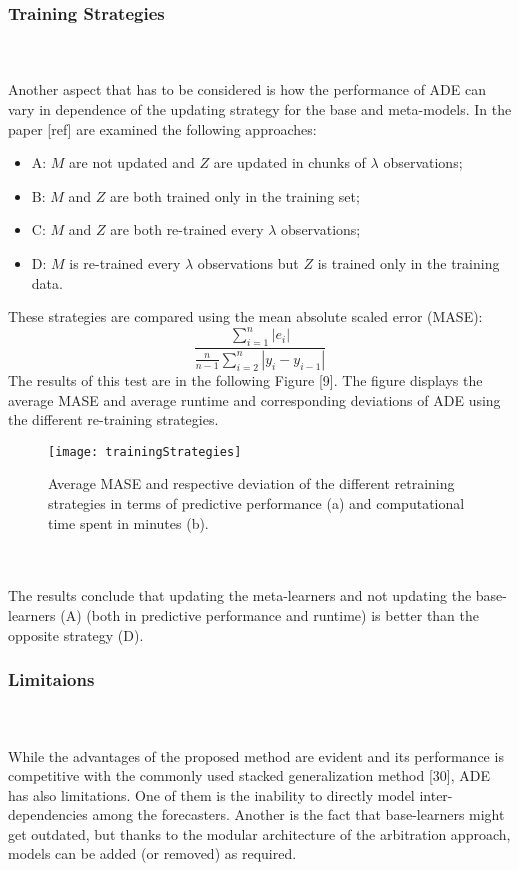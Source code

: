 \documentclass[runningheads,a4paper]{llncs}[2015/06/24]
\begin{document}
\subsubsection{Training Strategies}
\hspace{1cm}\\\\ Another aspect that has to be considered is how the performance of ADE can vary in dependence of the updating strategy for the base and meta-models. In the paper [ref] are examined the following approaches:
\begin{itemize}
\item A: $M$ are not updated and $Z$ are updated in chunks of $\lambda$ observations;
\item B: $M$ and $Z$ are both trained only in the training set;
\item C: $M$ and $Z$ are both re-trained every $\lambda$ observations;
\item D: $M$ is re-trained every $\lambda$ observations but $Z$ is trained only in the training data.
\end{itemize}
These strategies are compared using the mean absolute scaled error (MASE):
\begin{equation}
\frac{\sum^n_{i=1}|e_i|}{\frac{n}{n-1} \sum^n_{i=2}|y_i-y_{i-1}|}
\end{equation}
The results of this test are in the following Figure [9]. The figure displays the average MASE and average runtime and corresponding deviations of ADE using the different re-training strategies.

\begin{figure}[h]
\centering
\texttt{[image: trainingStrategies]}
\caption{ Average MASE and respective deviation of the different retraining strategies in terms of predictive performance (a) and computational time spent in minutes (b).}
\label{fig:training Strategies}
\end{figure}

\hspace{1cm}\\\\
The results conclude that updating the meta-learners and not updating the base-learners (A) (both in predictive performance and runtime) is better than the opposite strategy (D).

\subsubsection{Limitaions}
\hspace{1cm}\\\\ While the advantages of the proposed method are evident and its performance is competitive with the commonly used stacked generalization method [30], ADE has also limitations. One of them is the inability to directly model inter-dependencies among the forecasters. Another is the fact that base-learners might get outdated, but thanks to the modular architecture of the arbitration approach, models can be added (or removed) as required.
\end{document}
